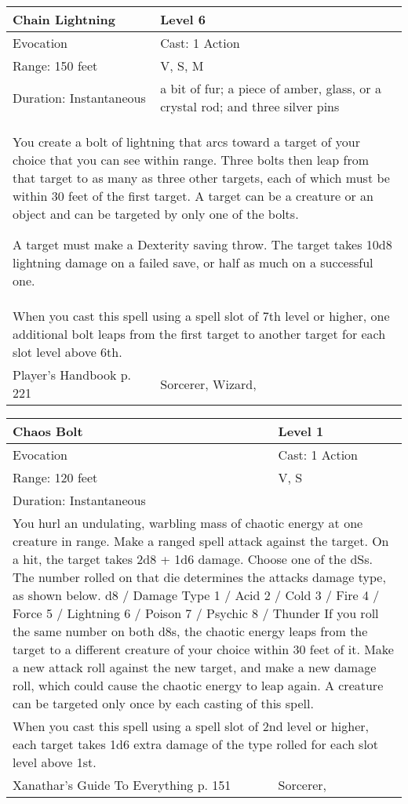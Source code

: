 \documentclass[11pt]{report}
\begin{document}
\begin{table}[H]
	\begin{tabular}{||p{6cm}|p{6cm}||}
		\hline\hline
		\bf{Chain Lightning} & Level 6\\ \hline
		Evocation & Cast: 1 Action\\ \hline
		Range: 150 feet & V, S, M \\ \hline
		Duration: Instantaneous & a bit of fur; a piece of amber, glass, or a crystal rod; and three silver pins\\ \hline
		\multicolumn{2}{||p{12cm}||}{You create a bolt of lightning that arcs toward a target of your choice that you can see within range. Three bolts then leap from that target to as many as three other targets, each of which must be within 30 feet of the first target. A target can be a creature or an object and can be targeted by only one of the bolts. 

A target must make a Dexterity saving throw. The target takes 10d8 lightning damage on a failed save, or half as much on a successful one.}\\ \hline
		\multicolumn{2}{||p{12cm}||}{When you cast this spell using a spell slot of 7th level or higher, one additional bolt leaps from the first target to another target for each slot level above 6th.}\\ \hline
Player's Handbook p. 221 & Sorcerer, Wizard, \\ \hline\hline
	\end{tabular}
\end{table}

\begin{table}[H]
	\begin{tabular}{||p{6cm}|p{6cm}||}
		\hline\hline
		\bf{Chaos Bolt} & Level 1\\ \hline
		Evocation & Cast: 1 Action\\ \hline
		Range: 120 feet & V, S\\ \hline
		Duration: Instantaneous & \\ \hline
		\multicolumn{2}{||p{12cm}||}{You hurl an undulating, warbling mass of chaotic energy at one creature in range. Make a ranged spell attack against the target. On a hit, the target takes 2d8 + 1d6 damage. Choose one of the dSs. The number rolled on that die determines the attacks damage type, as shown below.
d8 / Damage Type
1 / Acid
2 / Cold
3 / Fire
4 / Force
5 / Lightning
6 / Poison
7 / Psychic
8 / Thunder
If you roll the same number on both d8s, the chaotic energy leaps from the target to a different creature of your choice within 30 feet of it. Make a new attack roll against the new target, and make a new damage roll, which could cause the chaotic energy to leap again. A creature can be targeted only once by each casting of this spell.}\\ \hline
		\multicolumn{2}{||p{12cm}||}{When you cast this spell using a spell slot of 2nd level or higher, each target takes 1d6 extra damage of the type rolled for each slot level above 1st.}\\ \hline
Xanathar's Guide To Everything p. 151 & Sorcerer, \\ \hline\hline
	\end{tabular}
\end{table}
\end{document}
